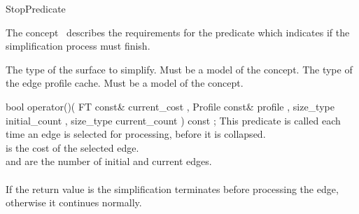 
\begin{ccRefConcept}{StopPredicate}


\ccDefinition

The concept \ccRefName\ describes the requirements for the predicate which indicates if the simplification process must finish.

\ccTypes
  {The type of the surface to simplify. Must be a model of the  concept.}{}
\ccGlue    
\ccGlue    
\ccGlue    
  {The type of the edge profile cache. Must be a model of the  concept.}{}


\ccOperations

  \ccMemberFunction
    {bool operator()( FT const&       current_cost
                    , Profile  const& profile
                    , size_type       initial_count
                    , size_type       current_count
                    ) const ;
    }
    {
    This predicate is called each time an edge is selected for processing,
    before it is collapsed.\\
     is the cost of the selected edge.\\
     and  are the number of initial and current edges.\\
    \\
    If the return value is  the simplification terminates before processing the edge,
    otherwise it continues normally.
    }
  
\ccHasModels
{}\\

\end{ccRefConcept}


